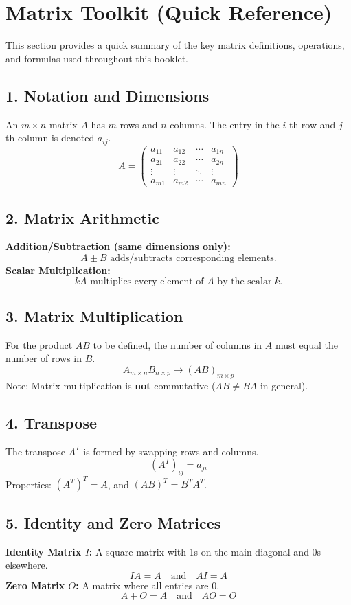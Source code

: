\section{Matrix Toolkit (Quick Reference)}

This section provides a quick summary of the key matrix definitions, operations, and formulas used throughout this booklet.

\subsection*{1. Notation and Dimensions}
An $m \times n$ matrix $A$ has $m$ rows and $n$ columns.
The entry in the $i$-th row and $j$-th column is denoted $a_{ij}$.
\[
A = \begin{pmatrix}
a_{11} & a_{12} & \cdots & a_{1n} \\
a_{21} & a_{22} & \cdots & a_{2n} \\
\vdots & \vdots & \ddots & \vdots \\
a_{m1} & a_{m2} & \cdots & a_{mn}
\end{pmatrix}
\]

\subsection*{2. Matrix Arithmetic}
\textbf{Addition/Subtraction (same dimensions only):}
\[ A \pm B \text{ adds/subtracts corresponding elements.} \]
\textbf{Scalar Multiplication:}
\[ kA \text{ multiplies every element of } A \text{ by the scalar } k. \]

\subsection*{3. Matrix Multiplication}
For the product $AB$ to be defined, the number of columns in $A$ must equal the number of rows in $B$.
\[
A_{m\times n} B_{n\times p} \to (AB)_{m\times p}
\]
Note: Matrix multiplication is \textbf{not} commutative ($AB \neq BA$ in general).

\subsection*{4. Transpose}
The transpose $A^T$ is formed by swapping rows and columns.
\[ (A^T)_{ij} = a_{ji} \]
Properties: $(A^T)^T = A$, and $(AB)^T = B^T A^T$.

\subsection*{5. Identity and Zero Matrices}
\textbf{Identity Matrix $I$:} A square matrix with 1s on the main diagonal and 0s elsewhere.
\[ IA = A \quad \text{and} \quad AI = A \]
\textbf{Zero Matrix $O$:} A matrix where all entries are 0.
\[ A + O = A \quad \text{and} \quad AO = O \]

